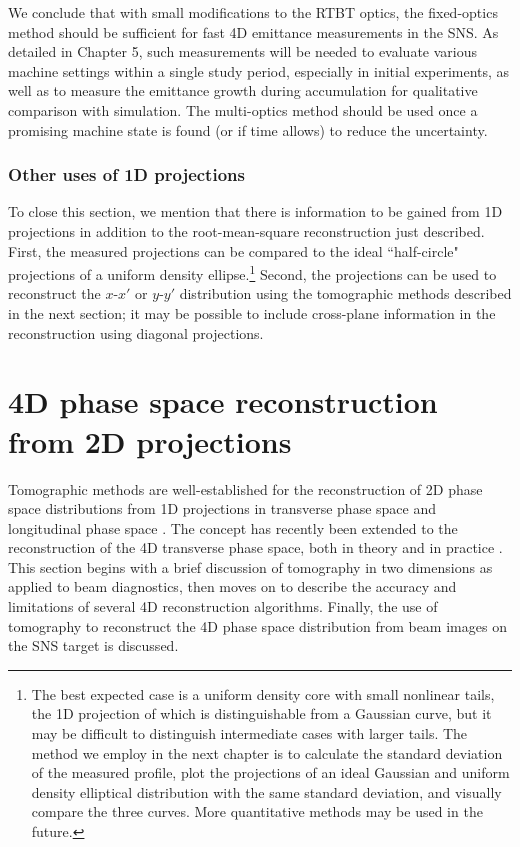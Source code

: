 We conclude that with small modifications to the RTBT optics, the fixed-optics method should be sufficient for fast 4D emittance measurements in the SNS. As detailed in Chapter 5, such measurements will be needed to evaluate various machine settings within a single study period, especially in initial experiments, as well as to measure the emittance growth during accumulation for qualitative comparison with simulation. The multi-optics method should be used once a promising machine state is found (or if time allows) to reduce the uncertainty.


\subsubsection{Other uses of 1D projections}

To close this section, we mention that there is information to be gained from 1D projections in addition to the root-mean-square reconstruction just described. First, the measured projections can be compared to the ideal ``half-circle" projections of a uniform density ellipse.\footnote{The best expected case is a uniform density core with small nonlinear tails, the 1D projection of which is distinguishable from a Gaussian curve, but it may be difficult to distinguish intermediate cases with larger tails. The method we employ in the next chapter is to calculate the standard deviation of the measured profile, plot the projections of an ideal Gaussian and uniform density elliptical distribution with the same standard deviation, and visually compare the three curves. More quantitative methods may be used in the future.} Second, the projections can be used to reconstruct the $x$-$x'$ or $y$-$y'$ distribution using the tomographic methods described in the next section; it may be possible to include cross-plane information in the reconstruction using diagonal projections. 


\section{4D phase space reconstruction from 2D projections}

Tomographic methods are well-established for the reconstruction of 2D phase space distributions from 1D projections in transverse phase space \cite{Hock2014} and longitudinal phase space \cite{Evans2014}. The concept has recently been extended to the reconstruction of the 4D transverse phase space, both in theory and in practice \cite{Hock2013b, Wang2019, Wolski2020}. This section begins with a brief discussion of tomography in two dimensions as applied to beam diagnostics, then moves on to describe the accuracy and limitations of several 4D reconstruction algorithms. Finally, the use of tomography to reconstruct the 4D phase space distribution from beam images on the SNS target is discussed. 



